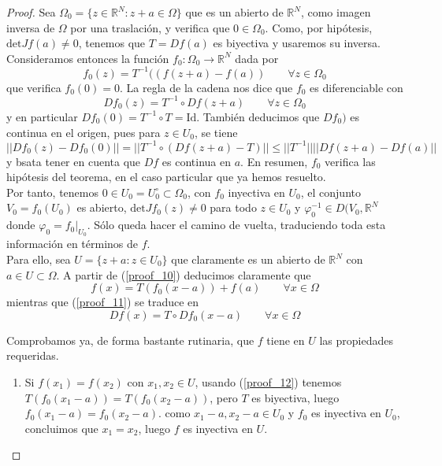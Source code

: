 \documentclass[a4paper, 12pt]{article}
\begin{document}
\begin{enumerate}[label=\textbf{\arabic*}.]
\begin{proof}
Sea \(\Omega_0 = \{ z \in \mathbb{R}^N : z + a \in \Omega\}\) que es un abierto de \(\mathbb{R}^N\), como imagen inversa de \(\Omega\) por una traslación, y verifica que \(0 \in \Omega_0\). Como, por hipótesis, \(\text{det}Jf(a) \neq 0\), tenemos que \(T = Df(a)\) es biyectiva y usaremos su inversa. Consideramos entonces la función \(f_0: \Omega_0 \to \mathbb{R}^N\) dada por
\begin{equation}\label{proof_10}
	f_0 (z) = T^{-1} ((f(z+a) - f(a)) \qquad \forall z \in \Omega_0
\end{equation}
que verifica \(f_0 (0) = 0\). La regla de la cadena nos dice que \(f_0\) es diferenciable con
\begin{equation}\label{proof_11}
Df_0 (z) = T^{-1} \circ Df(z+a) \qquad \forall z \in \Omega_0
\end{equation}
y en particular \(Df_0 (0) = T^{-1} \circ T = \text{Id}\). También deducimos que \(Df_0)\) es continua en el origen, pues para \(z \in U_0\), se tiene
\[
	||Df_0(z) - Df_0 (0)|| = || T^{-1} \circ (Df(z+a) - T)|| \leq ||T^{-1}|| || Df(z+a) - Df(a)||
\]
y bsata tener en cuenta que \(Df\) es continua en \(a\). En resumen, \(f_0\) verifica las hipótesis del teorema, en el caso particular que ya hemos resuelto. \\

Por tanto, tenemos \(0 \in U_0 = U_0^{\circ} \subset \Omega_0\), con \(f_0\) inyectiva en \(U_0\), el conjunto \(V_0 = f_0(U_0)\) es abierto, \(\text{det} Jf_0(z) \neq 0\) para todo \(z \in U_0\) y \(\varphi_0^{-1} \in D(V_0, \mathbb{R}^N\) donde \(\varphi_0 = f_0 |_{U_0}\). Sólo queda hacer el camino de vuelta, traduciendo toda esta información en términos de \(f\). \\

Para ello, sea \(U = \{ z+a : z \in U_0\}\) que claramente es un abierto de \(\mathbb{R}^N\) con \(a \in U \subset \Omega\). A partir de (\ref{proof_10}) deducimos claramente que
\begin{equation}\label{proof_12}
f(x) = T(f_0 (x-a)) + f(a) \qquad \forall x \in \Omega
\end{equation}
mientras que (\ref{proof_11}) se traduce en
\begin{equation}\label{proof_13}
Df(x) = T \circ Df_0 (x-a) \qquad \forall x \in \Omega
\end{equation}

Comprobamos ya, de forma bastante rutinaria, que \(f\) tiene en \(U\) las propiedades requeridas.

\begin{enumerate}[label=(\textit{\roman*})]
\item Si \(f(x_1) = f(x_2)\) con \(x_1, x_2 \in U\), usando (\ref{proof_12}) tenemos \(T(f_0(x_1 - a)) = T(f_0(x_2 -a ))\), pero \(T\) es biyectiva, luego \(f_0 (x_1 -a) = f_0 (x_2 -a)\). como \(x_1 -a, x_2 -a \in U_0\) y \(f_0\) es inyectiva en \(U_0\), concluimos que \(x_1 = x_2\), luego \(f \) es inyectiva en \(U\).


\end{enumerate}
\end{proof}
\end{enumerate}
\end{document}
